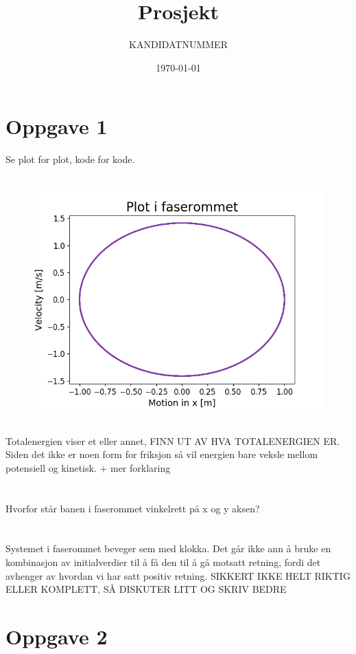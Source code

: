 \documentclass[norsk,a4paper,12pt]{article}
\title{Prosjekt}
\author{KANDIDATNUMMER}
\date{\today}
\begin{document}
\maketitle


\section*{Oppgave 1}

Se plot for plot, kode for kode.
\\
\\
\begin{figure}
\includegraphics[scale=1]{Oppgave1.png}
\end{figure}
\\
Totalenergien viser et eller annet, FINN UT AV HVA TOTALENERGIEN ER. Siden det ikke er noen form for friksjon så vil energien bare veksle mellom potensiell og kinetisk. + mer forklaring
\\
\\
\\
Hvorfor står banen i faserommet vinkelrett på x og y aksen?
\\
\\
\\
Systemet i faserommet beveger sem med klokka. Det går ikke ann å bruke en kombinasjon av initialverdier til å få den til å gå motsatt retning, fordi det avhenger av hvordan vi har satt positiv retning.  SIKKERT IKKE HELT RIKTIG ELLER KOMPLETT, SÅ DISKUTER LITT OG SKRIV BEDRE




\section*{Oppgave 2}
\end{document}
